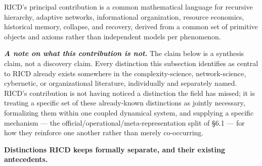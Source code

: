 \documentclass[
]{article}
\begin{document}
RICD's principal contribution is a common mathematical language for
recursive hierarchy, adaptive networks, informational organization,
resource economics, historical memory, collapse, and recovery, derived
from a common set of primitive objects and axioms rather than
independent models per phenomenon.

\emph{\textbf{A note on what this contribution is not.}} The claim below
is a synthesis claim, not a discovery claim. Every distinction this
subsection identifies as central to RICD already exists somewhere in the
complexity-science, network-science, cybernetic, or organizational
literature, individually and separately named. RICD's contribution is
not having noticed a distinction the field has missed; it is treating a
specific set of these already-known distinctions as jointly necessary,
formalizing them within one coupled dynamical system, and supplying a
specific mechanism --- the official/operational/meta-representation
split of §6.1 --- for how they reinforce one another rather than merely
co-occurring.

\textbf{Distinctions RICD keeps formally separate, and their existing
antecedents.}
\end{document}
